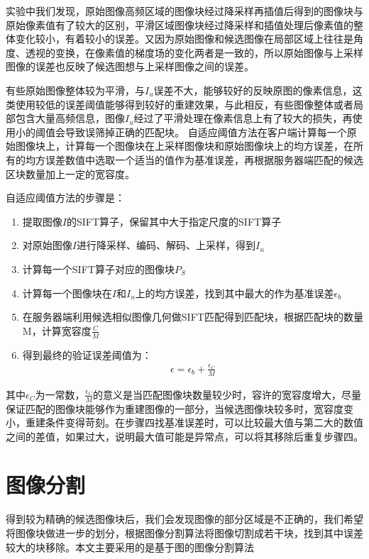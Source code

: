 实验中我们发现，原始图像高频区域的图像块经过降采样再插值后得到的图像块与原始像素值有了较大的区别，平滑区域图像块经过降采样和插值处理后像素值的整体变化较小，有着较小的误差。又因为原始图像和候选图像在局部区域上往往是角度、透视的变换，在像素值的梯度场的变化两者是一致的，所以原始图像与上采样图像的误差也反映了候选图想与上采样图像之间的误差。

有些原始图像整体较为平滑，与\(I_u\)误差不大，能够较好的反映原图的像素信息，这类使用较低的误差阈值能够得到较好的重建效果，与此相反，有些图像整体或者局部包含大量高频信息，图像\(I_u\)经过了平滑处理在像素信息上有了较大的损失，再使用小的阈值会导致误筛掉正确的匹配块。
自适应阈值方法在客户端计算每一个原始图像块上，计算每一个图像块在上采样图像块和原始图像块上的均方误差，在所有的均方误差数值中选取一个适当的值作为基准误差，再根据服务器端匹配的候选区块数量加上一定的宽容度。

自适应阈值方法的步骤是：
\begin{enumerate}
\item 提取图像\(I\)的SIFT算子，保留其中大于指定尺度的SIFT算子
\item 对原始图像\(I\)进行降采样、编码、解码、上采样，得到\(I_u\)
\item 计算每一个SIFT算子对应的图像块\(P_S\)
\item 计算每一个图像块在\(I\)和\(I_u\)上的均方误差，找到其中最大的作为基准误差\(\epsilon_b\)
\item 在服务器端利用候选相似图像几何做SIFT匹配得到匹配块，根据匹配块的数量M，计算宽容度\(\frac{C}{M}\)
\item 得到最终的验证误差阈值为：
\begin{align}
\epsilon = \epsilon_b + \frac{\epsilon_C}{M}
\end{align}
\end{enumerate}

其中\(\epsilon_C\)为一常数，\(\frac{\epsilon_C}{M}\)的意义是当匹配图像块数量较少时，容许的宽容度增大，尽量保证匹配的图像块能够作为重建图像的一部分，当候选图像块较多时，宽容度变小，重建条件变得苛刻。在步骤四找基准误差时，可以比较最大值与第二大的数值之间的差值，如果过大，说明最大值可能是异常点，可以将其移除后重复步骤四。

\section{图像分割}

得到较为精确的候选图像块后，我们会发现图像的部分区域是不正确的，我们希望将图像块做进一步的划分，根据图像分割算法将图像切割成若干块，找到其中误差较大的块移除。本文主要采用的是基于图的图像分割算法

